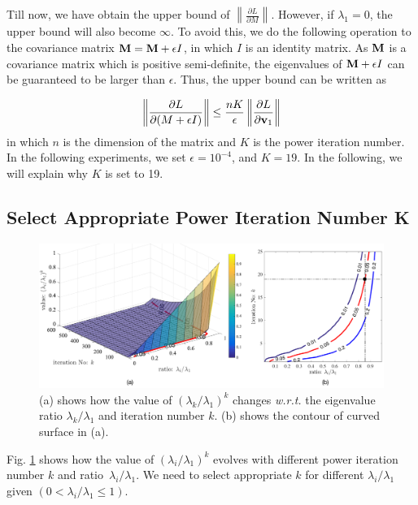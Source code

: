 Till now, we have obtain the upper bound of $\left\| \frac{\partial L}{\partial M} \right\|$. However, if $\lambda_{1} = 0$, the upper bound will also become $\infty$. To avoid this, we do the following operation to the covariance matrix $\mathbf{M} = \mathbf{M} + \epsilon I$, in which $I$ is an identity matrix. As $\mathbf{M}$ is a covariance matrix which is positive semi-definite, the eigenvalues of $\mathbf{M} + \epsilon I$ can be guaranteed to be larger than $\epsilon$.
Thus, the upper bound can be written as 

\begin{equation}
	\begin{aligned}
	\left\| \frac{\partial L}{\partial (M+\epsilon I) } \right\|
	\leq \frac{nK}{\epsilon} \left\|  \frac{\partial L}{\partial \mathbf{v}_{1}} \right\|
	\end{aligned}
\end{equation}
in which $n$ is the dimension of the matrix and $K$ is the power iteration number. In the following experiments, we set $\epsilon = 10^{-4}$, and $K=19$.
In the following, we will explain why $K$ is set to 19.

\subsection{Select Appropriate Power Iteration Number K}

\begin{figure}[!htb]
\begin{center}
\includegraphics[width=\linewidth]{ratio-k.pdf}
\end{center}
\caption{(a) shows how the value of $(\lambda_k/\lambda_1)^k$ changes \emph{w.r.t.} the eigenvalue ratio $\lambda_k/\lambda_1$ and iteration number $k$. (b) shows the contour of curved surface in (a).}
\label{fig: curve}
\end{figure}

Fig. \ref{fig: curve} shows how the value of $(\lambda_i/\lambda_1)^k$ evolves with different power iteration number $k$ and ratio~$\lambda_i/\lambda_1$. We need to select appropriate $k$ for different $\lambda_i/\lambda_1$ given $(0 < \lambda_i/\lambda_1 \leq 1)$. 

